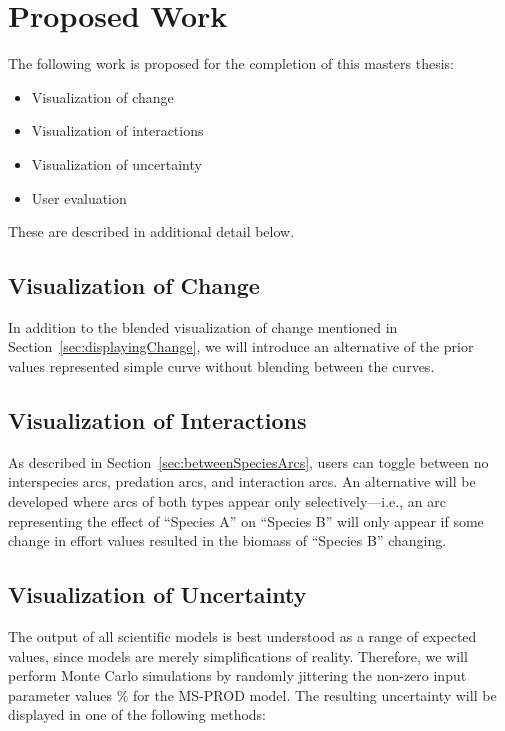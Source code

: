 \chapter{Proposed Work}

The following work is proposed for the completion of this masters thesis:

\begin{itemize}
  \item Visualization of change
  \item Visualization of interactions
  \item Visualization of uncertainty
  \item User evaluation
\end{itemize}

These are described in additional detail below.

\section{Visualization of Change}

In addition to the blended visualization of change mentioned in Section~\ref{sec:displayingChange}, we will introduce an alternative of the prior values represented simple curve without blending between the curves.

\section{Visualization of Interactions}

As described in Section~\ref{sec:betweenSpeciesArcs}, users can toggle between no interspecies arcs, predation arcs, and interaction arcs.  An alternative will be developed where arcs of both types appear only selectively---i.e., an arc representing the effect of ``Species A'' on ``Species B'' will only appear if some change in effort values resulted in the biomass of ``Species B'' changing.

\section{Visualization of Uncertainty}

The output of all scientific models is best understood as a range of expected values, since models are merely simplifications of reality.  Therefore, we will perform Monte Carlo simulations by randomly jittering the non-zero input parameter values \% for the MS-PROD model.  The resulting uncertainty will be displayed in one of the following methods:

